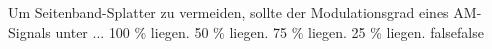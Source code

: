     {Um Seitenband-Splatter zu vermeiden, sollte der Modulationsgrad eines AM-Signals unter ...}
    {100 \% liegen.}
    {50 \% liegen.}
    {75 \% liegen.}
    {25 \% liegen.}
    {false}{false}